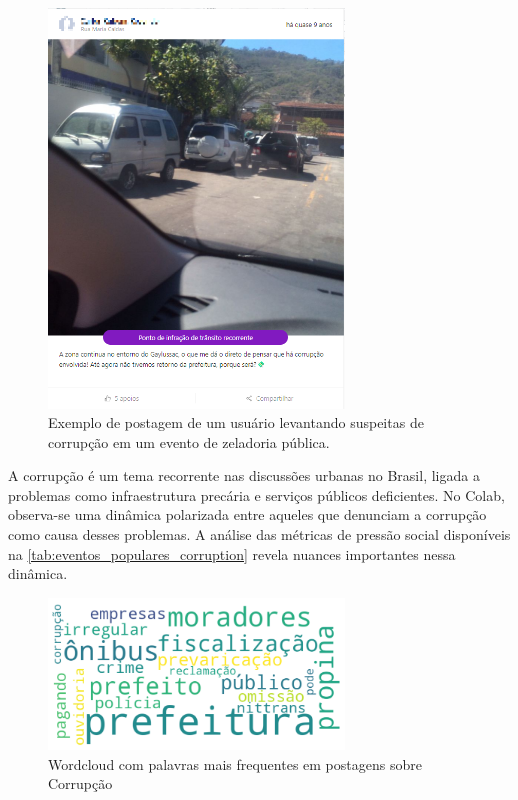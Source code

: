 \begin{figure}[htb]
	\centering
	\includegraphics[width=0.7\textwidth]{images/colab_posts_corruption.png}
	\caption{Exemplo de postagem de um usuário levantando suspeitas de corrupção em um evento de zeladoria pública.}
	\label{fig:colab_posts_corruption}
\end{figure}

A corrupção é um tema recorrente nas discussões urbanas no Brasil, ligada a problemas como infraestrutura precária e serviços públicos deficientes. No Colab, observa-se uma dinâmica polarizada entre aqueles que denunciam a corrupção como causa desses problemas. A análise das métricas de pressão social disponíveis na \autoref{tab:eventos_populares_corruption} revela nuances importantes nessa dinâmica.

\begin{figure}[htb]
	\centering
	\includegraphics[width=0.7\textwidth]{images/wordcloud_corruption.png}
	\caption{Wordcloud com palavras mais frequentes em postagens sobre Corrupção}
	\label{fig:wordcloud_corruption}
\end{figure}

